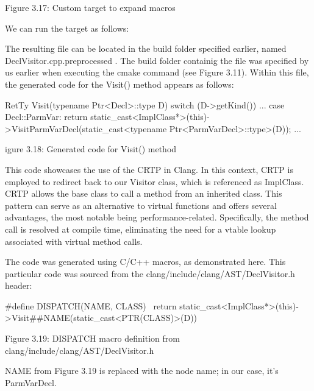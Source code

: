 \begin{center}
Figure 3.17: Custom target to expand macros
\end{center}

We can run the target as follows:


The resulting file can be located in the build folder specified earlier, named DeclVisitor.cpp.preprocessed . The build folder containig the file was specified by us earlier when executing the cmake command (see Figure 3.11). Within this file, the generated code for the Visit() method appears as follows:

\begin{cpp}
RetTy Visit(typename Ptr<Decl>::type D) {
  switch (D->getKind()) {
  ...
  case Decl::ParmVar: return static_cast<ImplClass*>(this)->VisitParmVarDecl(static_cast<typename Ptr<ParmVarDecl>::type>(D));
  ...
  }
}
\end{cpp}

\begin{center}
igure 3.18: Generated code for Visit() method
\end{center}

This code showcases the use of the CRTP in Clang. In this context, CRTP is employed to redirect back to our Visitor class, which is referenced as ImplClass. CRTP allows the base class to call a method from an inherited class. This pattern can serve as an alternative to virtual functions and offers several advantages, the most notable being performance-related. Specifically, the method call is resolved at compile time, eliminating the need for a vtable lookup associated with virtual method calls.

The code was generated using C/C++ macros, as demonstrated here. This particular code was sourced from the clang/include/clang/AST/DeclVisitor.h header:

\begin{cpp}
#define DISPATCH(NAME, CLASS) \
  return static_cast<ImplClass*>(this)->Visit##NAME(static_cast<PTR(CLASS)>(D))
\end{cpp}

\begin{center}
Figure 3.19: DISPATCH macro definition from clang/include/clang/AST/DeclVisitor.h
\end{center}

NAME from Figure 3.19 is replaced with the node name; in our case, it's ParmVarDecl.


